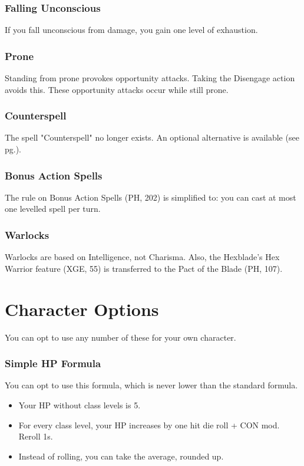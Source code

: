 \documentclass[letterpaper,twocolumn,openany,nodeprecatedcode]{dndbook}
\newcommand{\pg}[1]{pg.\pageref{#1}}
\newcommand{\see}[1]{(see \pg{#1})}
\begin{document}
\subsection{Falling Unconscious}
If you fall unconscious from damage, you gain one level of exhaustion.

\subsection{Prone}
Standing from prone provokes opportunity attacks. Taking the Disengage action avoids this.
These opportunity attacks occur while still prone.

\subsection{Counterspell}
The spell "Counterspell" no longer exists. An optional alternative is available \see{counterspell}.

\subsection{Bonus Action Spells}
The rule on Bonus Action Spells (PH, 202) is simplified to: you can cast at most one levelled spell per turn.

\subsection{Warlocks}
Warlocks are based on Intelligence, not Charisma. Also, the Hexblade's Hex Warrior feature (XGE, 55) is transferred to the Pact of the Blade (PH, 107).










\chapter{Character Options}
\noindent You can opt to use any number of these for your own character.

\subsection{Simple HP Formula}
You can opt to use this formula, which is never lower than the standard formula.
\begin{itemize}
\item Your HP without class levels is 5.
\item For every class level, your HP increases by one hit die roll + CON mod. Reroll 1s. 
\item Instead of rolling, you can take the average, rounded up.
\end{itemize}
\end{document}
